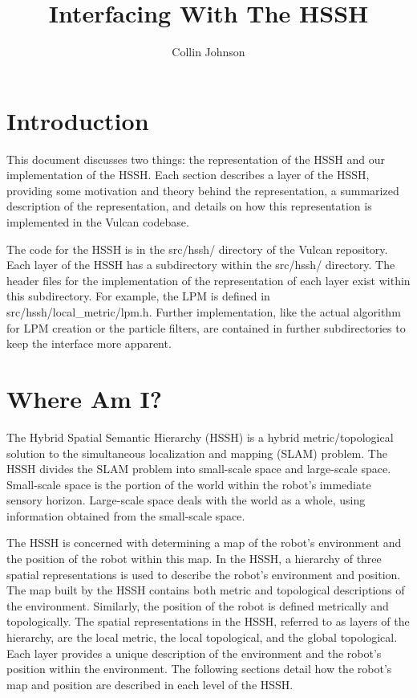 \documentclass{article}
\title{Interfacing With The HSSH}
\author{Collin Johnson}
\begin{document}
\maketitle

\section{Introduction}
This document discusses two things: the representation of the HSSH and our implementation of the HSSH. Each section
describes a layer of the HSSH, providing some motivation and theory behind the representation, a summarized description
of the representation, and details on how this representation is implemented in the Vulcan codebase.

The code for the HSSH is in the src/hssh/ directory of the Vulcan repository. Each layer of the HSSH has a subdirectory
within the src/hssh/ directory. The header files for the implementation of the representation of each layer exist
within this subdirectory. For example, the LPM is defined in src/hssh/local\_metric/lpm.h. Further implementation, like
the actual algorithm for LPM creation or the particle filters, are contained in further subdirectories to keep the
interface more apparent.

\section{Where Am I?}
The Hybrid Spatial Semantic Hierarchy (HSSH) is a hybrid metric/topological solution to the simultaneous localization
and mapping (SLAM) problem. The HSSH divides the SLAM problem into small-scale space and large-scale space. Small-scale
space is the portion of the world within the robot's immediate sensory horizon. Large-scale space deals with the world
as a whole, using information obtained from the small-scale space.

The HSSH is concerned with determining a map of the robot's environment and the position of the robot within this map. 
In the HSSH, a hierarchy of three spatial representations is used to describe the robot's environment and position. The
map built by the HSSH contains both metric and topological descriptions of the environment. Similarly, the position of
the robot is defined metrically and topologically. The spatial representations in the HSSH, referred to as layers of the
hierarchy, are the local metric, the local topological, and the global topological. Each layer provides a unique
description of the environment and the robot's position within the environment. The following sections detail how the
robot's map and position are described in each level of the HSSH.
\end{document}
